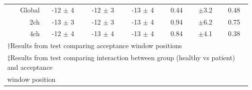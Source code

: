 \begin{table}
\begin{tabular}{c c c c c c c}
			\multicolumn{1}{r}{Global}        & -12 $\pm$ 4 & -12 $\pm$ 3 & -13 $\pm$ 4 & 0.44 & $\pm$3.2 & 0.48  \\
			\multicolumn{1}{r}{2ch}  		  & -13 $\pm$ 3 & -12 $\pm$ 3 & -13 $\pm$ 4 & 0.94 & $\pm$6.2 & 0.75  \\
			\multicolumn{1}{r}{4ch}  		  & -12 $\pm$ 4 & -13 $\pm$ 4 & -13 $\pm$ 4 & 0.84 & $\pm$4.1 & 0.38  \\ 
			\bottomrule
			\multicolumn{7}{l}{$\dagger$Results from test comparing acceptance window positions} \\
			\multicolumn{7}{l}{$\ddagger$Results from test comparing interaction between group (healthy vs patient) and acceptance} \\
			\multicolumn{7}{l}{window position}
		\end{tabular}
	\end{table}

